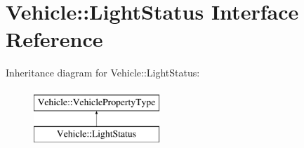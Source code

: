 \hypertarget{interfaceVehicle_1_1LightStatus}{\section{Vehicle\-:\-:Light\-Status Interface Reference}
\label{interfaceVehicle_1_1LightStatus}
}
Inheritance diagram for Vehicle\-:\-:Light\-Status\-:\begin{figure}[H]
\begin{center}
\leavevmode
\includegraphics[height=2.000000cm]{interfaceVehicle_1_1LightStatus}
\end{center}
\end{figure}

